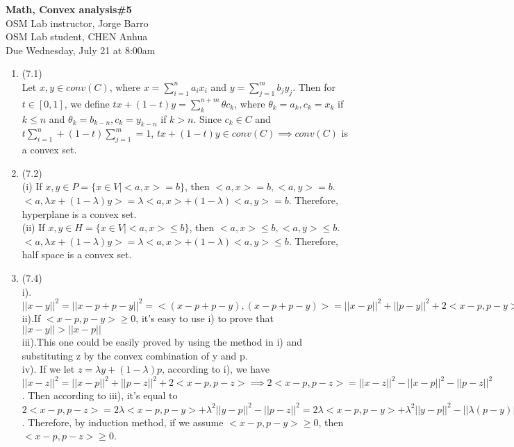 \documentclass[letterpaper,12pt]{article}
\theoremstyle{definition}
\begin{document}
\begin{flushleft}
   \textbf{\large{Math, Convex analysis\#5}} \\[5pt]
   OSM Lab instructor, Jorge Barro\\[5pt]
   OSM Lab student, CHEN Anhua\\[5pt]
   Due Wednesday, July 21 at 8:00am
\end{flushleft}

\vspace{5mm}


\begin{enumerate}
	\item(7.1)\\
	Let $x, y \in conv(C)$, where $x = \sum_{i = 1}^{n}a_{i}x_{i} $ and $y = \sum_{j = 1}^{m}b_{j}y_{j}$. Then for $t \in [0, 1]$, we define $tx + (1 - t)y = \sum_{k}^{n+m} \theta c_{k}$, where $\theta_{k} = a_{k}, c_{k} = x_{k}$ if $k \leq n $ and $\theta_{k} = b_{k-n}, c_{k} = y_{k- n}$ if $k > n$. Since $c_{k} \in C $ and $t\sum_{i = 1}^{n} + (1 - t)\sum_{j = 1}^{m} = 1 $, $tx + (1 - t)y \in conv(C) \implies conv(C)$ is a convex set.\\

	\item(7.2)\\
		(i)  If $x, y \in P = \{ x \in V | <a, x> = b \}$, then $<a, x> = b, <a, y> = b$. $<a, \lambda x + (1 - \lambda) y> = \lambda<a, x> + (1 - \lambda)<a, y> =  b$. Therefore, hyperplane is a convex set.\\
		(ii)  If $x, y \in H = \{ x \in V | <a, x> \leq b \}$, then $<a, x> \leq b, <a, y> \leq b$. $<a, \lambda x + (1 - \lambda) y> = \lambda<a, x> + (1 - \lambda)<a, y> \leq  b$. Therefore, half space is a convex set.\\

	\item(7.4)\\
	i). $||x - y||^2 = ||x - p + p - y||^2 = <(x - p + p - y) , (x - p + p - y)>  = ||x - p||^2 + ||p - y||^2 + 2<x - p, p-y> $\\
	ii).If $<x - p, p-y> \geq 0$, it's easy to use i) to prove that $||x - y|| > ||x - p||$\\
	iii).This one could be easily proved by using the method in i) and substituting z by the convex combination of y and p.\\
	iv). If we let $z = \lambda y + (1 - \lambda) p$, according to i), we have $||x - z||^{2} = ||x - p||^{2} + ||p - z||^2 + 2 <x - p, p - z> \implies 2 <x - p, p - z> = ||x - z||^{2} - ||x - p||^{2} - ||p - z||^2$. Then according to iii), it's equal to $2 <x - p, p - z> = 2\lambda <x - p, p -y> + \lambda^2||y - p||^2 - ||p - z||^2 =  2\lambda <x - p, p -y> + \lambda^2||y - p||^2 -||\lambda (p - y)||^2 = 2\lambda <x - p, p -y> $. Therefore, by induction method, if we assume $<x - p, p -y> \geq 0$, then $<x - p, p - z> \geq 0$.\\
	

\end{enumerate}
\end{document}
